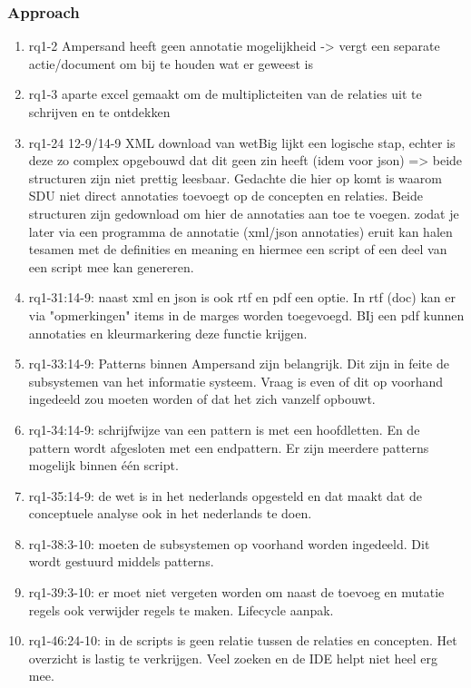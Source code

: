\subsubsection{Approach}
\begin{comment}
plaats hier de afgehandelde items.
\end{comment}
\begin{enumerate}
    \item rq1-2 Ampersand heeft geen annotatie mogelijkheid -> vergt een separate actie/document om bij te houden wat er geweest is
    \item rq1-3 aparte excel gemaakt om de multiplicteiten van de relaties uit te schrijven en te ontdekken
    \item rq1-24 12-9/14-9 XML download van wetBig lijkt een logische stap, echter is deze zo complex opgebouwd dat dit geen zin heeft (idem voor json) => beide structuren zijn niet prettig leesbaar. Gedachte die hier op komt is waarom SDU niet direct annotaties toevoegt op de concepten en relaties. Beide structuren zijn gedownload om hier de annotaties aan toe te voegen. zodat je later via een programma de annotatie (xml/json annotaties) eruit kan halen tesamen met de definities en meaning en hiermee een script of een deel van een script mee kan genereren.
    \item rq1-31:14-9: naast xml en json is ook rtf en pdf een optie. In rtf (doc) kan er via "opmerkingen" items in de marges worden toegevoegd. BIj een pdf kunnen annotaties en kleurmarkering deze functie krijgen.
    \item rq1-33:14-9: Patterns binnen Ampersand zijn belangrijk. Dit zijn in feite de subsystemen van het informatie systeem. Vraag is even of dit op voorhand ingedeeld zou moeten worden of dat het zich vanzelf opbouwt.
    \item rq1-34:14-9: schrijfwijze van een pattern is met een hoofdletten. En de pattern wordt afgesloten met een endpattern. Er zijn meerdere patterns mogelijk binnen één script.
    \item rq1-35:14-9: de wet is in het nederlands opgesteld en dat maakt dat de conceptuele analyse ook in het nederlands te doen.
    \item rq1-38:3-10: moeten de subsystemen op voorhand worden ingedeeld. Dit wordt gestuurd middels patterns. 
    \item rq1-39:3-10: er moet niet vergeten worden om naast de toevoeg en mutatie regels ook verwijder regels te maken. Lifecycle aanpak.
    \item rq1-46:24-10: in de scripts is geen relatie tussen de relaties en concepten. Het overzicht is lastig te verkrijgen. Veel zoeken en de IDE helpt niet heel erg mee.

\end{enumerate}
